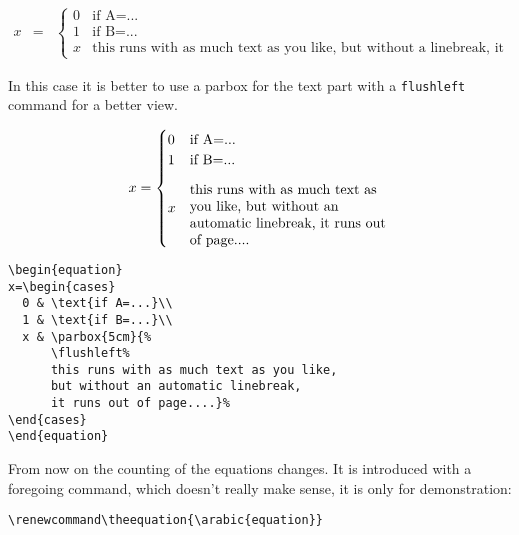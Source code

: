 \begin{table}[htb]
\begin{eqnarray}
x & = & \begin{cases}
0 & \text{if A=...}\\
1 & \text{if B=...}\\
x & \textrm{this runs with as much text as you like, but without a linebreak, it runs out of page....}\end{cases}\label{eq:cases}\end{eqnarray}


In this case it is better to use a parbox
for the text part with a \texttt{flushleft} command for a better view.

\begin{equation}
x=\begin{cases}
0 & \text{if A=...}\\
1 & \text{if B=...}\\
x & \parbox{5cm}{\flushleft this runs with as much text as you like, but without an automatic linebreak, it runs out of page....}\end{cases}\end{equation}



\begin{lstlisting}
\begin{equation}
x=\begin{cases}
  0 & \text{if A=...}\\
  1 & \text{if B=...}\\
  x & \parbox{5cm}{%
      \flushleft%
      this runs with as much text as you like,
      but without an automatic linebreak,
      it runs out of page....}%
\end{cases}
\end{equation}
\end{lstlisting}

\begin{leftbar}
\noindent From now on the counting of the equations changes. It is introduced 
with a foregoing command, which doesn't really make sense, it is only for 
demonstration: 
\begin{lstlisting}
\renewcommand\theequation{\arabic{equation}}
\end{lstlisting}
\end{leftbar}

\renewcommand\theequation{\arabic{equation}}



\end{table}

